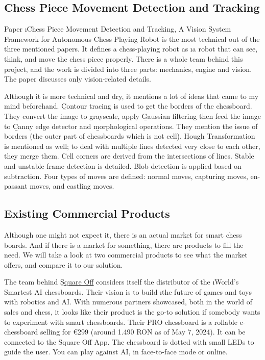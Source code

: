 
\subsection{Chess Piece Movement Detection and Tracking} \label{subsec:chess-piece-movement-detection-and-tracking}

Paper \i{Chess Piece Movement Detection and Tracking, A Vision System Framework for Autonomous Chess Playing Robot}\cite{chesspiecemovement} is the most technical out of the three mentioned papers. It defines a chess-playing robot as \i{a robot that can see, think, and move the chess piece properly}. There is a whole team behind this project, and the work is divided into three parts: mechanics, engine and vision. The paper discusses only vision-related details.

Although it is more technical and dry, it mentions a lot of ideas that came to my mind beforehand. \b{Contour tracing} is used to get the borders of the chessboard. They convert the image to grayscale, apply \b{Gaussian filtering} then feed the image to \b{Canny edge detector} and \b{morphological operations}. They mention the issue of borders (the outer part of chessboards which is not cell). \b{Hough Transformation} is mentioned as well; to deal with multiple lines detected very close to each other, they merge them. Cell corners are derived from the intersections of lines. Stable and unstable frame detection is detailed. Blob detection is applied based on subtraction. Four types of moves are defined: normal moves, capturing moves, en-passant moves, and castling moves.



\subsection{Existing Commercial Products} \label{subsec:existing-commercial-products}

Although one might not expect it, there is an actual market for smart chess boards. And if there is a market for something, there are products to fill the need. We will take a look at two commercial products to see what the market offers, and compare it to our solution.

The team behind \href{https://squareoffnow.com/}{\b{Square Off}} considers itself the distributor of the \i{World's Smartest AI chessboards}. Their vision is to build \i{the future of games and toys with robotics and AI}. With numerous partners showcased, both in the world of sales and chess, it looks like their product is the go-to solution if somebody wants to experiment with smart chessboards. Their PRO chessboard is a rollable e-chessboard selling for €299 (around 1.490 RON as of May 7, 2024). It can be connected to the Square Off App. The chessboard is dotted with small LEDs to guide the user. You can play against AI, in face-to-face mode or online.

